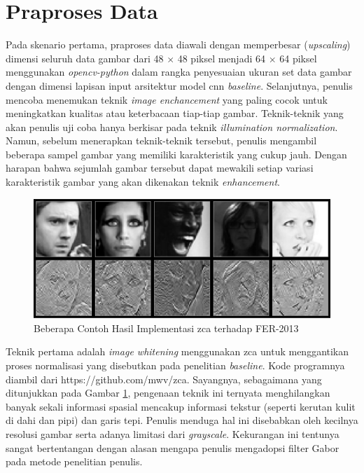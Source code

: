 \section{Praproses Data}
Pada skenario pertama, praproses data diawali dengan memperbesar (\textit{upscaling}) dimensi seluruh data gambar dari 48 $\times$ 48 piksel menjadi 64 $\times$ 64 piksel menggunakan \textit{opencv-python} dalam rangka penyesuaian ukuran set data gambar dengan dimensi lapisan input arsitektur model \acrshort{cnn} \textit{baseline}. %
Selanjutnya, penulis mencoba menemukan teknik \textit{image enchancement} yang paling cocok untuk meningkatkan kualitas atau keterbacaan tiap-tiap gambar. Teknik-teknik yang akan penulis uji coba hanya berkisar pada teknik \textit{illumination normalization}. Namun, sebelum menerapkan teknik-teknik tersebut, penulis mengambil beberapa sampel gambar yang memiliki karakteristik yang cukup jauh. Dengan harapan bahwa sejumlah gambar tersebut dapat mewakili setiap variasi karakteristik gambar yang akan dikenakan teknik \textit{enhancement}.

\begin{figure}
    \centering
    \includegraphics[width=14cm]{gambar/contoh_zca2.png}
    \caption{Beberapa Contoh Hasil Implementasi \acrshort{zca} terhadap FER-2013}
    \label{fig:contohzca2}
\end{figure}
Teknik pertama adalah \textit{image whitening} menggunakan \acrshort{zca} untuk menggantikan proses normalisasi yang disebutkan pada penelitian \textit{baseline}. Kode programnya diambil dari https://github.com/mwv/zca. Sayangnya, sebagaimana yang ditunjukkan pada Gambar \ref{fig:contohzca2}, pengenaan teknik ini ternyata menghilangkan banyak sekali informasi spasial mencakup informasi tekstur (seperti kerutan kulit di dahi dan pipi) dan garis tepi. Penulis menduga hal ini disebabkan oleh kecilnya resolusi gambar serta adanya limitasi dari \textit{grayscale}. Kekurangan ini tentunya sangat bertentangan dengan alasan mengapa penulis mengadopsi filter Gabor pada metode penelitian penulis.

